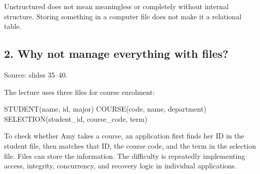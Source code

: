Unstructured does not mean meaningless or completely without internal structure. Storing something in a computer file does not make it a relational table.

\subsection{2. Why not manage everything with files?}\label{01_database_fundamentals_en-why-not-manage-everything-with-files}

Source: slides 35--40.

The lecture uses three files for course enrolment:

\begin{StudyCode}
STUDENT(name, id, major)
COURSE(code, name, department)
SELECTION(student_id, course_code, term)
\end{StudyCode}

To check whether Amy takes a course, an application first finds her ID in the student file, then matches that ID, the course code, and the term in the selection file. Files can store the information. The difficulty is repeatedly implementing access, integrity, concurrency, and recovery logic in individual applications.


